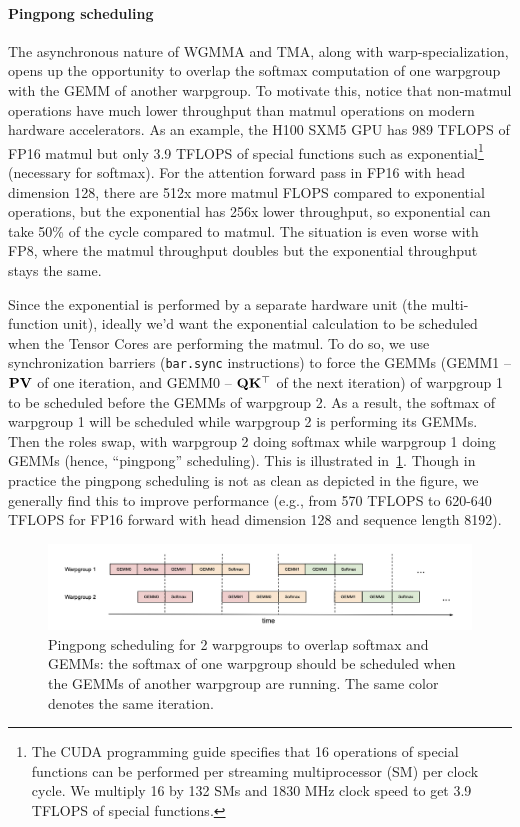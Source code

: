 \paragraph{Pingpong scheduling}
The asynchronous nature of WGMMA and TMA, along with warp-specialization, opens
up the opportunity to overlap the softmax computation of one warpgroup with the GEMM of
another warpgroup.
To motivate this, notice that non-matmul operations have much lower throughput
than matmul operations on modern hardware accelerators.
As an example, the H100 SXM5 GPU has 989 TFLOPS of FP16 matmul but only 3.9
TFLOPS of special functions such as exponential\footnote{The CUDA programming
  guide specifies that 16 operations of special functions can be performed per
  streaming multiprocessor (SM) per clock cycle. We multiply 16 by 132 SMs and
  1830 MHz clock speed to get 3.9 TFLOPS of special functions.} (necessary for softmax).
For the attention forward pass in FP16 with head dimension 128, there are 512x more matmul FLOPS
compared to exponential operations, but the exponential has 256x lower
throughput, so exponential can take 50\% of the cycle compared to matmul.
The situation is even worse with FP8, where the matmul throughput doubles but
the exponential throughput stays the same.

Since the exponential is performed by a separate hardware unit (the multi-function
unit), ideally we'd want the exponential calculation to be scheduled when the
Tensor Cores are performing the matmul.
To do so, we use synchronization barriers (\texttt{bar.sync} instructions) to
force the GEMMs (GEMM1 -- $\mathbf{P} \mathbf{V}$ of one iteration, and GEMM0 -- $\mathbf{Q} \mathbf{K}^\top$
of the next iteration) of warpgroup 1 to be scheduled before the GEMMs of
warpgroup 2.
As a result, the softmax of warpgroup 1 will be scheduled while warpgroup 2 is
performing its GEMMs. Then the roles swap, with warpgroup 2 doing softmax while
warpgroup 1 doing GEMMs (hence, ``pingpong'' scheduling).
This is illustrated in~\cref{fig:pingpong_scheduling}.
Though in practice the pingpong scheduling is not as clean as depicted in the
figure, we generally find this to improve performance (e.g., from 570 TFLOPS to
620-640 TFLOPS for FP16 forward with head dimension 128 and sequence length 8192).
\begin{figure}[ht]
    \centering
    \includegraphics[width=1.0\linewidth]{figs/pingpong_pipelining.png}
    \caption{Pingpong scheduling for 2 warpgroups to overlap softmax and GEMMs: the softmax of one warpgroup
      should be scheduled when the GEMMs of another warpgroup are running. The
      same color denotes the same iteration.}
    \label{fig:pingpong_scheduling}
\end{figure}

